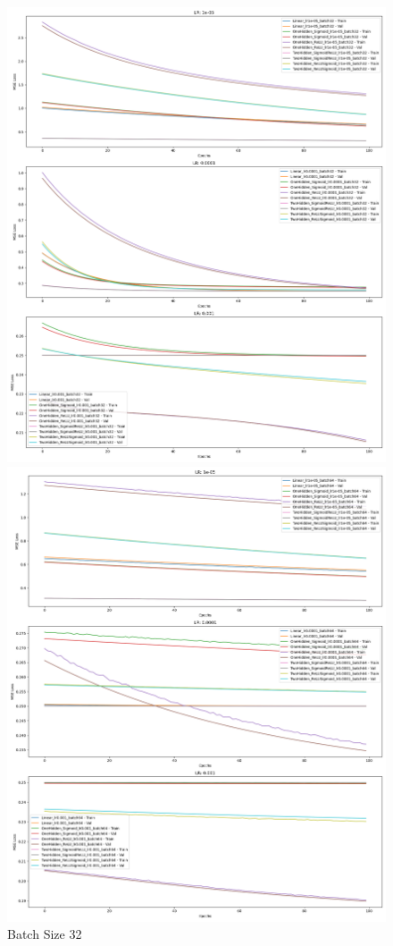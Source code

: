 \begin{figure}[!htbp]
    \centering
    \begin{minipage}{0.32\linewidth}
        \includegraphics[width=\linewidth]{mse_model_losses_batch32.png}
        \caption{Batch Size 32}
    \end{minipage}
    \hfill
    \begin{minipage}{0.32\linewidth}
        \includegraphics[width=\linewidth]{mse_model_losses_batch64.png}

\end{minipage}
\end{figure}
